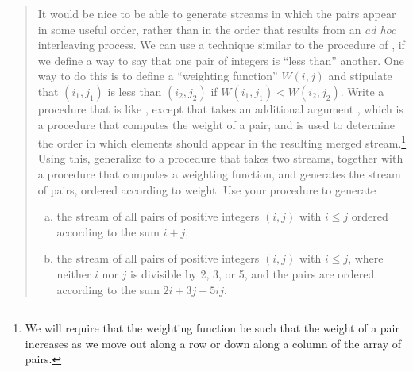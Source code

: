 \begin{quote}
 It would be nice to be able to
generate streams in which the pairs appear in some useful order, rather than in
the order that results from an \emph{ad hoc} interleaving process.  We can use
a technique similar to the  procedure of , if we
define a way to say that one pair of integers is ``less than'' another.  One
way to do this is to define a ``weighting function'' \( W(i, j) \) and
stipulate that \( (i_1, j_1) \) is less than \( (i_2, j_2) \) if
\( W(i_1, j_1) < W(i_2, j_2) \).  Write a procedure
 that is like , except that
 takes an additional argument , which is a
procedure that computes the weight of a pair, and is used to determine the
order in which elements should appear in the resulting merged
stream.\footnote{We will require that the weighting function be such that the
weight of a pair increases as we move out along a row or down along a column of
the array of pairs.}  Using this, generalize  to a procedure
 that takes two streams, together with a procedure that
computes a weighting function, and generates the stream of pairs, ordered
according to weight.  Use your procedure to generate

\begin{enumerate}[a.]

\item
the stream of all pairs of positive integers \( (i, j) \) with \( i \le j \)
ordered according to the sum \( i + j \),

\item
the stream of all pairs of positive integers \( (i, j) \) with \( i \le j \),
where neither \( i \) nor \( j \) is divisible by 2, 3, or 5, and the pairs are
ordered according to the sum \( 2i + 3\!j + 5i\!j \).

\end{enumerate}
\end{quote}


